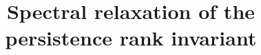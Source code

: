 \documentclass{article}
\begin{document}
\title{Spectral relaxation of the persistence rank invariant}
\maketitle

\cite{bai2009learning}



\end{document}
